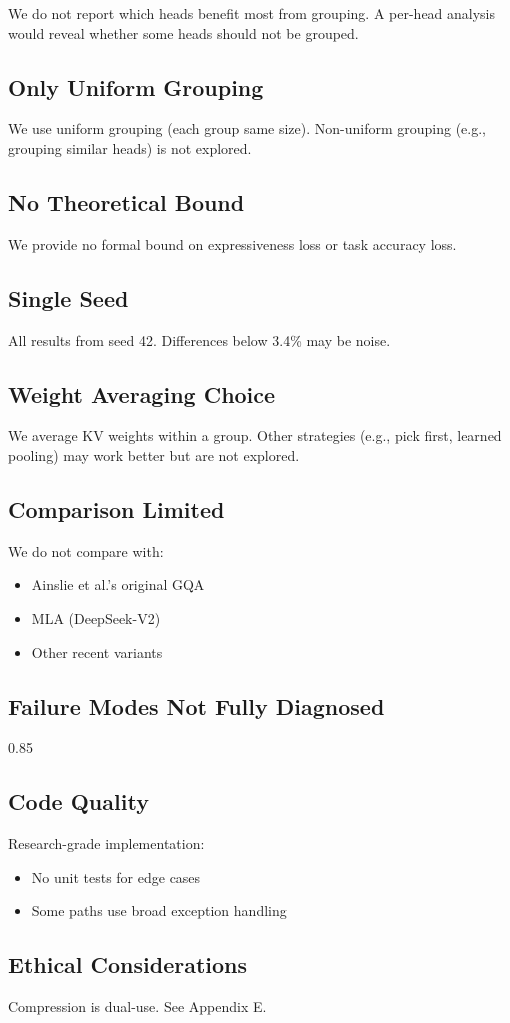 We do not report which heads benefit most from grouping. A per-head analysis 
would reveal whether some heads should not be grouped.

\subsection{Only Uniform Grouping}

We use uniform grouping (each group same size). Non-uniform grouping 
(e.g., grouping similar heads) is not explored.

\subsection{No Theoretical Bound}

We provide no formal bound on expressiveness loss or task accuracy loss.

\subsection{Single Seed}

All results from seed 42. Differences below 3.4\% may be noise.

\subsection{Weight Averaging Choice}

We average KV weights within a group. Other strategies (e.g., pick first, 
learned pooling) may work better but are not explored.

\subsection{Comparison Limited}

We do not compare with:
\begin{itemize}
\item Ainslie et al.'s original GQA
\item MLA (DeepSeek-V2)
\item Other recent variants

\end{itemize}
\subsection{Failure Modes Not Fully Diagnosed}

0.85

\subsection{Code Quality}

Research-grade implementation:
\begin{itemize}
\item No unit tests for edge cases
\item Some paths use broad exception handling

\end{itemize}
\subsection{Ethical Considerations}

Compression is dual-use. See Appendix E.